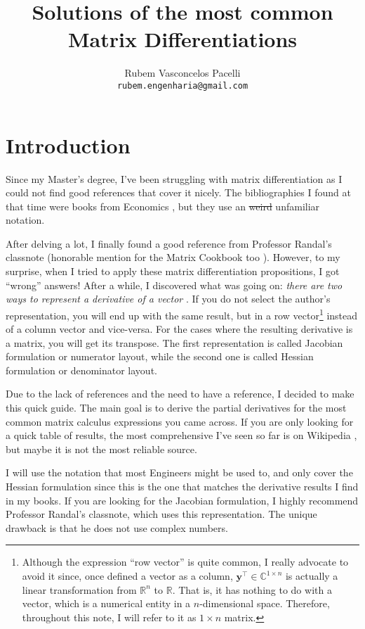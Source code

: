 \documentclass{article}
\title{\textbf{Solutions of the most common Matrix Differentiations}  \vspace{-.3cm}}
\author{Rubem Vasconcelos Pacelli\\
  {\tt rubem.engenharia@gmail.com}}
\affil{Department of Teleinformatics Engineering, Federal University of Ceará.\\Fortaleza, Ceará, Brazil. \vspace{-.5cm}}
\newcommand{\trans}{\top}
\begin{document}
\maketitle
\tableofcontents

\section{Introduction}
Since my Master's degree, I've been struggling with matrix differentiation as I could not find good references that cover it nicely. The bibliographies I found at that time were books from Economics \cite{dhrymes1978mathematics}, but they use an \st{weird} unfamiliar notation.

After delving a lot, I finally found a good reference from Professor Randal's classnote \cite{barnes2006matrix} (honorable mention for the Matrix Cookbook too \cite{petersen2008matrix}). However, to my surprise, when I tried to apply these matrix differentiation propositions, I got ``wrong'' answers! After a while, I discovered what was going on: \emph{there are two ways to represent a derivative of a vector} \cite{Singh}. If you do not select the author's representation, you will end up with the same result, but in a row vector\footnote{Although the expression ``row vector'' is quite common, I really advocate to avoid it since, once defined a vector as a column, \(\mathbf{y}^{\trans} \in \mathbb{C}^{1\times n}\) is actually a linear transformation from \(\mathbb{R}^{n}\) to \(\mathbb{R}\). That is, it has nothing to do with a vector, which is a numerical entity in a \(n\)-dimensional space. Therefore, throughout this note, I will refer to it as \(1\times n\) matrix.} instead of a column vector and vice-versa. For the cases where the resulting derivative is a matrix, you will get its transpose. The first representation is called Jacobian formulation or numerator layout, while the second one is called Hessian formulation or denominator layout.

Due to the lack of references and the need to have a reference, I decided to make this quick guide. The main goal is to derive the partial derivatives for the most common matrix calculus expressions you came across. If you are only looking for a quick table of results, the most comprehensive I've seen so far is on Wikipedia \cite{Matrixca44:online}, but maybe it is not the most reliable source.

I will use the notation that most Engineers might be used to, and only cover the Hessian formulation since this is the one that matches the derivative results I find in my books. If you are looking for the Jacobian formulation, I highly recommend Professor Randal's classnote, which uses this representation. The unique drawback is that he does not use complex numbers.
\end{document}
